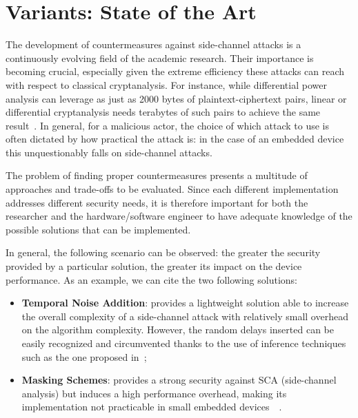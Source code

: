 \chapter{\sbocs{} Variants: State of the Art}\label{chap:soa}


    The development of countermeasures against side-channel attacks is a continuously evolving field of the academic research. Their importance is becoming crucial, especially given the extreme efficiency these attacks can reach with respect to classical cryptanalysis. For instance, while differential power analysis can leverage as just as 2000 bytes of plaintext-ciphertext pairs, linear or differential cryptanalysis needs terabytes of such pairs to achieve the same result~\cite{carlet2005highly}. In general, for a malicious actor, the choice of which attack to use is often dictated by how practical the attack is: in the case of an embedded device this unquestionably falls on side-channel attacks.

    The problem of finding proper countermeasures presents a multitude of approaches and trade-offs to be evaluated. Since each different implementation addresses different security needs, it is therefore important for both the researcher and the hardware/software engineer to have adequate knowledge of the possible solutions that can be implemented.

    In general, the following scenario can be observed: the greater the security provided by a particular solution, the greater its impact on the device performance. As an example, we can cite the two following solutions:
    
    \begin{itemize}
        \item \textbf{Temporal Noise Addition}: provides a lightweight solution able to increase the overall complexity of a side-channel attack with relatively small overhead on the algorithm complexity. However, the random delays inserted can be easily recognized and circumvented thanks to the use of inference techniques such as the one proposed in~\cite{coron2010analysis};
        \item \textbf{Masking Schemes}: provides a strong security against SCA (side-channel analysis) but induces a high performance overhead, making its implementation not practicable in small embedded devices~\cite{chari1999towards}~\cite{piret2012picaro}.
    \end{itemize}

